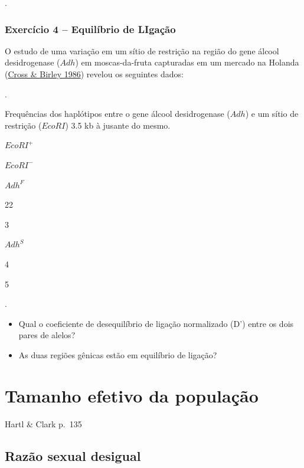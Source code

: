 \documentclass[
]{book}
\begin{document}
.\linebreak

\hypertarget{exercuxedcio-4-equiluxedbrio-de-ligauxe7uxe3o}{%
\subsection{Exercício 4 -- Equilíbrio de LIgação}\label{exercuxedcio-4-equiluxedbrio-de-ligauxe7uxe3o}}

O estudo de uma variação em um sítio de restrição na região do gene álcool desidrogenase (\(Adh\)) em moscas-da-fruta capturadas em um mercado na Holanda (\href{https://doi.org/10.1007/BF00499097}{Cross \& Birley 1986}) revelou os seguintes dados:

.\linebreak

\label{tab:tableC09}Frequências dos haplótipos entre o gene álcool desidrogenase (\(Adh\)) e um sítio de restrição (\(EcoRI\)) 3.5 kb à jusante do mesmo.

\(EcoRI^+\)

\(EcoRI^-\)

\(Adh^F\)

22

3

\(Adh^S\)

4

5

.\linebreak

\begin{itemize}
\item
  Qual o coeficiente de desequilíbrio de ligação normalizado (D') entre os dois pares de alelos?
\item
  As duas regiões gênicas estão em equilíbrio de ligação?
\end{itemize}

\hypertarget{tamanho-efetivo-da-populauxe7uxe3o}{%
\chapter{Tamanho efetivo da população}\label{tamanho-efetivo-da-populauxe7uxe3o}}

Hartl \& Clark p.~135

\hypertarget{razuxe3o-sexual-desigual}{%
\section{Razão sexual desigual}\label{razuxe3o-sexual-desigual}}
\end{document}

